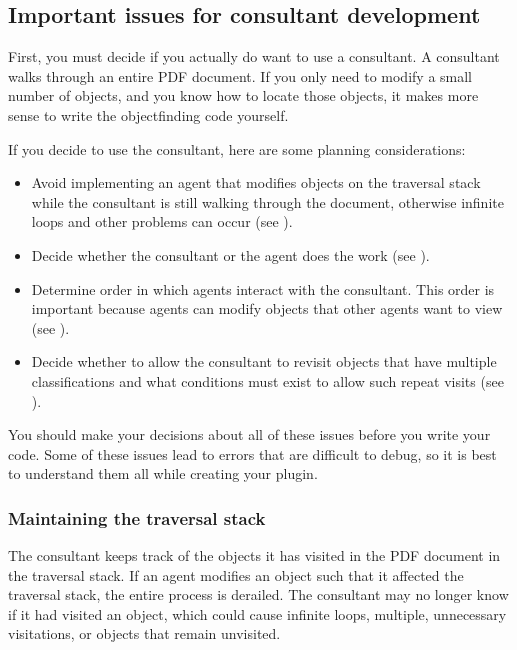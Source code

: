 \documentclass[letterpaper,12pt,english,openany,oneside]{sphinxmanual}
\begin{document}
\subsection{Important issues for consultant development}
\label{\detokenize{Plugins_ExtendedAPI:important-issues-for-consultant-development}}
First, you must decide if you actually do want to use a consultant. A consultant walks through an entire PDF document. If you only need to modify a small number of objects, and you know how to locate those objects, it makes more sense to write the object\sphinxhyphen{}finding code yourself.

If you decide to use the consultant, here are some planning considerations:
\begin{itemize}
\item {} 
Avoid implementing an agent that modifies objects on the traversal stack while the consultant is still walking through the document, otherwise infinite loops and other problems can occur (see ).

\item {} 
Decide whether the consultant or the agent does the work (see ).

\item {} 
Determine order in which agents interact with the consultant. This order is important because agents can modify objects that other agents want to view (see ).

\item {} 
Decide whether to allow the consultant to revisit objects that have multiple classifications and what conditions must exist to allow such repeat visits (see ).

\end{itemize}

You should make your decisions about all of these issues before you write your code. Some of these issues lead to errors that are difficult to debug, so it is best to understand them all while creating your plugin.


\subsubsection{Maintaining the traversal stack}
\label{\detokenize{Plugins_ExtendedAPI:maintaining-the-traversal-stack}}
The consultant keeps track of the objects it has visited in the PDF document in the traversal stack. If an agent modifies an object such that it affected the traversal stack, the entire process is derailed. The consultant may no longer know if it had visited an object, which could cause infinite loops, multiple, unnecessary visitations, or objects that remain unvisited.
\end{document}
